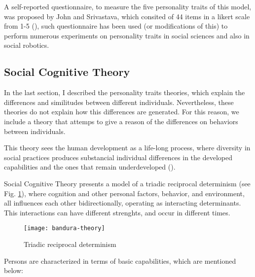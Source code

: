 A self-reported questionnaire, to measure the five personality traits of this model, was proposed by John and Srivastava, which consited of 44 items in a likert scale from 1-5 (\cite{john1999big}), such questionnaire has been used (or modifications of this) to perform numerous experiments on personality traits in social sciences and also in social robotics.


\subsection{Social Cognitive Theory}
\label{sub:social-cognitive-theory}

In the last section, I described the personality traits theories, which explain the differences and similitudes between different individuals. Nevertheless, these theories do not explain how this differences are generated. For this reason, we include a theory that attemps to give a reason of the differences on behaviors between individuals.

This theory sees the human development as a life-long process, where diversity in social practices produces substancial individual differences in the developed capabilities and the ones that remain underdeveloped (\cite{bandura2011social}).

Social Cognitive Theory presents a model of a triadic reciprocal determinism (see Fig. \ref{fig:bandura-theory}), where cognition and other personal factors, behavior, and environment, all influences each other bidirectionally, operating as interacting determinants. This interactions can have different strenghts, and occur in different times. 

\begin{figure}[]
\centering
	\texttt{[image: bandura-theory]}
    \caption{Triadic reciprocal determinism}
\label{fig:bandura-theory}
\end{figure}

Persons are characterized in terms of basic capabilities, which are mentioned below:

